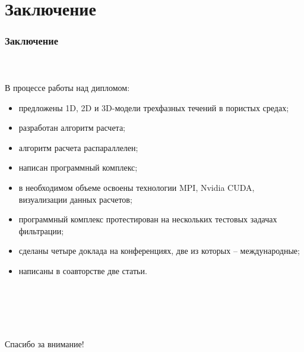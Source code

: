 \section{Заключение}
\begin{frame}
\begin{center}
\frametitle{Заключение}
\framesubtitle{\ }
В процессе работы над дипломом:
\begin{itemize}
  \item предложены 1D, 2D и 3D-модели трехфазных течений в пористых средах;
  \item разработан алгоритм расчета;
  \item алгоритм расчета распараллелен;
  \item написан программный комплекс;
  \item в необходимом объеме освоены технологии MPI, Nvidia CUDA, визуализации данных расчетов;
  \item программный комплекс протестирован на нескольких тестовых задачах 
  фильтрации;
  \item сделаны четыре доклада на конференциях, две из которых -- международные;
  \item написаны в соавторстве две статьи.
\end{itemize}
\end{center}
\end{frame}

\begin{frame}
\begin{center}
\frametitle{\ }
\framesubtitle{\ }
\item {\huge Спасибо за внимание!}
\end{center}
\end{frame}